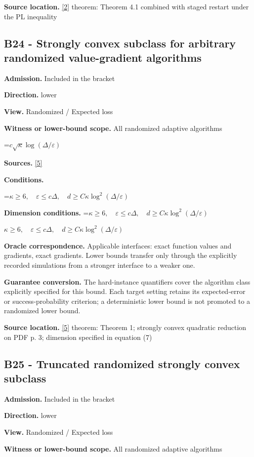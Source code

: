 \documentclass[10pt,a4paper]{article}
\newcommand{\AtlasMath}[1]{\par\begingroup\centering\setbox0=\hbox{$\displaystyle #1$}\ifdim\wd0>1.4\linewidth\typeout{ATLAS WIDE FORMULA: \the\wd0}\fi\ifdim\wd0>\linewidth\resizebox{\linewidth}{!}{\box0}\else\box0\fi\par\endgroup}
\newcommand{\AtlasInlineMath}[1]{\begingroup\setbox0=\hbox{$#1$}\ifdim\wd0>.4\linewidth\endgroup\AtlasMath{#1}\else\endgroup$#1$\fi}
\begin{document}
\textbf{Source location.} \href{https://arxiv.org/pdf/2310.09157}{[2]} theorem: Theorem 4.1 combined with staged restart under the PL inequality

\subsection{B24 - Strongly convex subclass for arbitrary randomized value-gradient algorithms}
\textbf{Admission.} Included in the bracket

\textbf{Direction.} lower

\textbf{View.} Randomized / Expected loss

\textbf{Witness or lower-bound scope.} All randomized adaptive algorithms

\AtlasMath{c\sqrt\kappa\log(\Delta/\varepsilon)}
\textbf{Sources.} \href{https://arxiv.org/pdf/2609.10874}{[5]}

\textbf{Conditions.} 
\AtlasMath{\kappa\ge6,\quad\varepsilon\le c\Delta,\quad d\ge C\kappa\log^2(\Delta/\varepsilon)}


\textbf{Dimension conditions.} \AtlasInlineMath{\kappa\ge6,\quad\varepsilon\le c\Delta,\quad d\ge C\kappa\log^2(\Delta/\varepsilon)}

\textbf{Oracle correspondence.} Applicable interfaces: exact function values and gradients, exact gradients. Lower bounds transfer only through the explicitly recorded simulations from a stronger interface to a weaker one.

\textbf{Guarantee conversion.} The hard-instance quantifiers cover the algorithm class explicitly specified for this bound. Each target setting retains its expected-error or success-probability criterion; a deterministic lower bound is not promoted to a randomized lower bound.

\textbf{Source location.} \href{https://arxiv.org/pdf/2609.10874}{[5]} theorem: Theorem 1; strongly convex quadratic reduction on PDF p. 3; dimension specified in equation (7)

\subsection{B25 - Truncated randomized strongly convex subclass}
\textbf{Admission.} Included in the bracket

\textbf{Direction.} lower

\textbf{View.} Randomized / Expected loss

\textbf{Witness or lower-bound scope.} All randomized adaptive algorithms
\end{document}
